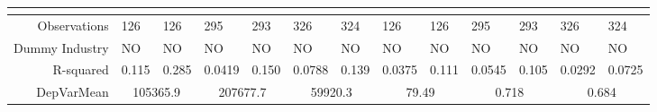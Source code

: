 \begin{tabular}{rrrrrrrrrrrrr}
      & \multicolumn{1}{l}{} & \multicolumn{1}{l}{} & \multicolumn{1}{l}{} & \multicolumn{1}{l}{} & \multicolumn{1}{l}{} & \multicolumn{1}{l}{} & \multicolumn{1}{l}{} & \multicolumn{1}{l}{} & \multicolumn{1}{l}{} & \multicolumn{1}{l}{} & \multicolumn{1}{l}{} & \multicolumn{1}{l}{} \\
      \midrule
Observations & \multicolumn{1}{l}{126} & \multicolumn{1}{l}{126} & \multicolumn{1}{l}{295} & \multicolumn{1}{l}{293} & \multicolumn{1}{l}{326} & \multicolumn{1}{l}{324} & \multicolumn{1}{l}{126} & \multicolumn{1}{l}{126} & \multicolumn{1}{l}{295} & \multicolumn{1}{l}{293} & \multicolumn{1}{l}{326} & \multicolumn{1}{l}{324} \\
Dummy Industry & \multicolumn{1}{l}{NO} & \multicolumn{1}{l}{NO} & \multicolumn{1}{l}{NO} & \multicolumn{1}{l}{NO} & \multicolumn{1}{l}{NO} & \multicolumn{1}{l}{NO} & \multicolumn{1}{l}{NO} & \multicolumn{1}{l}{NO} & \multicolumn{1}{l}{NO} & \multicolumn{1}{l}{NO} & \multicolumn{1}{l}{NO} & \multicolumn{1}{l}{NO} \\
R-squared & \multicolumn{1}{l}{0.115} & \multicolumn{1}{l}{0.285} & \multicolumn{1}{l}{0.0419} & \multicolumn{1}{l}{0.150} & \multicolumn{1}{l}{0.0788} & \multicolumn{1}{l}{0.139} & \multicolumn{1}{l}{0.0375} & \multicolumn{1}{l}{0.111} & \multicolumn{1}{l}{0.0545} & \multicolumn{1}{l}{0.105} & \multicolumn{1}{l}{0.0292} & \multicolumn{1}{l}{0.0725} \\
DepVarMean & \multicolumn{2}{c}{105365.9} & \multicolumn{2}{c}{207677.7} & \multicolumn{2}{c}{59920.3} & \multicolumn{2}{c}{79.49} & \multicolumn{2}{c}{0.718} & \multicolumn{2}{c}{0.684} \\
\bottomrule
\end{tabular}%
